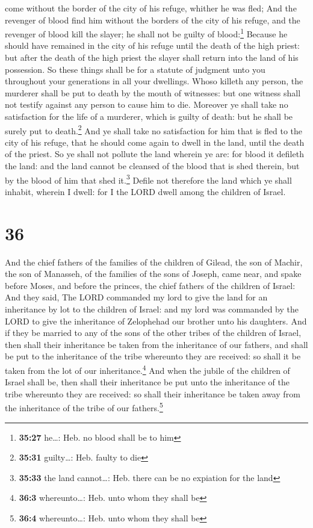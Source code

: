 come without the border of the city of his refuge, whither he was fled;
 And the revenger of blood find him without the borders
of the city of his refuge, and the revenger of blood kill the slayer; he
shall not be guilty of blood:\footnote{\textbf{35:27} he\ldots: Heb. no
  blood shall be to him}  Because he should have remained
in the city of his refuge until the death of the high priest: but after
the death of the high priest the slayer shall return into the land of
his possession.  So these things shall be for a statute
of judgment unto you throughout your generations in all your dwellings.
 Whoso killeth any person, the murderer shall be put to
death by the mouth of witnesses: but one witness shall not testify
against any person to cause him to die.  Moreover ye
shall take no satisfaction for the life of a murderer, which is guilty
of death: but he shall be surely put to death.\footnote{\textbf{35:31}
  guilty\ldots: Heb. faulty to die}  And ye shall take no
satisfaction for him that is fled to the city of his refuge, that he
should come again to dwell in the land, until the death of the priest.
 So ye shall not pollute the land wherein ye are: for
blood it defileth the land: and the land cannot be cleansed of the blood
that is shed therein, but by the blood of him that shed it.\footnote{\textbf{35:33}
  the land cannot\ldots: Heb. there can be no expiation for the land}
 Defile not therefore the land which ye shall inhabit,
wherein I dwell: for I the LORD dwell among the children of Israel.

\hypertarget{section-35}{%
\section{36}\label{section-35}}

 And the chief fathers of the families of the children of
Gilead, the son of Machir, the son of Manasseh, of the families of the
sons of Joseph, came near, and spake before Moses, and before the
princes, the chief fathers of the children of Israel:  And
they said, The LORD commanded my lord to give the land for an
inheritance by lot to the children of Israel: and my lord was commanded
by the LORD to give the inheritance of Zelophehad our brother unto his
daughters.  And if they be married to any of the sons of
the other tribes of the children of Israel, then shall their inheritance
be taken from the inheritance of our fathers, and shall be put to the
inheritance of the tribe whereunto they are received: so shall it be
taken from the lot of our inheritance.\footnote{\textbf{36:3}
  whereunto\ldots: Heb. unto whom they shall be}  And when
the jubile of the children of Israel shall be, then shall their
inheritance be put unto the inheritance of the tribe whereunto they are
received: so shall their inheritance be taken away from the inheritance
of the tribe of our fathers.\footnote{\textbf{36:4} whereunto\ldots:
  Heb. unto whom they shall be}

